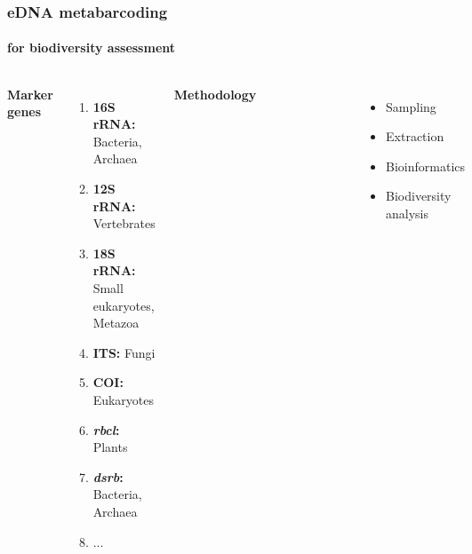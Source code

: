 \documentclass{beamer}
\begin{document}
   \begin{frame}
      
      \frametitle{eDNA metabarcoding}
      \framesubtitle{for biodiversity assessment}
      \begin{singlespace}


         \begin{columns}[onlytextwidth]


               \textbf{Marker genes} \\ 

               \begin{enumerate}
                  \item \textbf{16S rRNA:} Bacteria, Archaea
                  \item \textbf{12S rRNA:} Vertebrates
                  \item \textbf{18S rRNA:} Small eukaryotes, Metazoa
                  \item \textbf{ITS:} Fungi
                  \item \textbf{COI:} Eukaryotes
                  \item \textbf{\textit{rbcl}:} Plants
                  \item \textbf{\textit{dsrb}:} Bacteria, Archaea
                  \item ...
               \end{enumerate}


               \textbf{Methodology}

               \begin{figure}
                  \includegraphics[width=55mm]{resources/metabarcoding-steps.png}
               \end{figure}

               \begin{itemize}
                  \item Sampling
                  \item Extraction
                  \item Bioinformatics
                  \item Biodiversity analysis
               \end{itemize}
               

         \end{columns}

      \end{singlespace}
   \end{frame}
\end{document}
